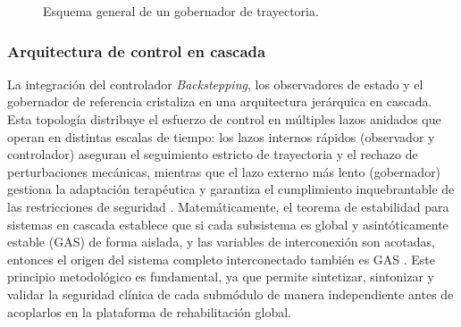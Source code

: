 \documentclass[a4paper,12pt]{article}
\begin{document}
\begin{figure}[H]
    \centering
    \caption{Esquema general de un gobernador de trayectoria.}
    \label{fig:gbt}
\end{figure}

\subsubsection{Arquitectura de control en cascada}

La integración del controlador \textit{Backstepping}, los observadores de estado y el gobernador de referencia cristaliza en una arquitectura jerárquica en cascada. Esta topología distribuye el esfuerzo de control en múltiples lazos anidados que operan en distintas escalas de tiempo: los lazos internos rápidos (observador y controlador) aseguran el seguimiento estricto de trayectoria y el rechazo de perturbaciones mecánicas, mientras que el lazo externo más lento (gobernador) gestiona la adaptación terapéutica y garantiza el cumplimiento inquebrantable de las restricciones de seguridad \citep{khalil2002nonlinear}. Matemáticamente, el teorema de estabilidad para sistemas en cascada establece que si cada subsistema es global y asintóticamente estable (GAS) de forma aislada, y las variables de interconexión son acotadas, entonces el origen del sistema completo interconectado también es GAS \citep{khalil2002nonlinear}. Este principio metodológico es fundamental, ya que permite sintetizar, sintonizar y validar la seguridad clínica de cada submódulo de manera independiente antes de acoplarlos en la plataforma de rehabilitación global.
\end{document}
